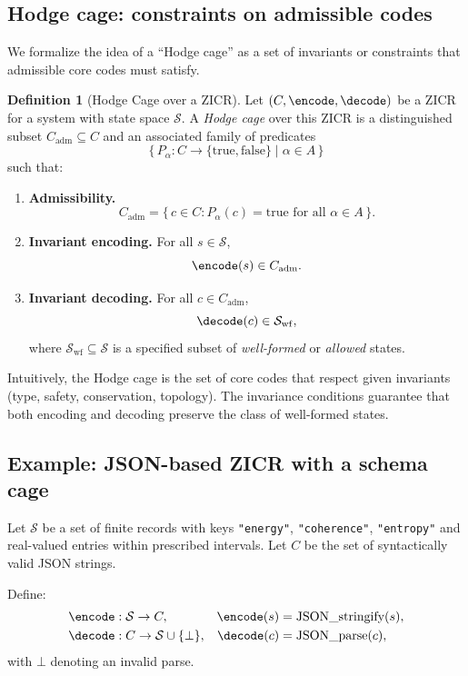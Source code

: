 \documentclass[11pt]{article}
\theoremstyle{definition}
\newtheorem{definition}{Definition}[section]
\begin{document}
\subsection{Hodge cage: constraints on admissible codes}

We formalize the idea of a ``Hodge cage'' as a set of invariants or constraints that admissible core codes must satisfy.

\begin{definition}[Hodge Cage over a ZICR]\label{def:hodge-cage}
Let $(C,\encode,\decode)$ be a ZICR for a system with state space $\mathcal{S}$.
A \emph{Hodge cage} over this ZICR is a distinguished subset $C_{\mathrm{adm}} \subseteq C$ and an associated family of predicates
\[
\{\, P_\alpha : C \to \{\mathrm{true},\mathrm{false}\} \mid \alpha \in A \,\}
\]
such that:
\begin{enumerate}
    \item \textbf{Admissibility.}
    \[
        C_{\mathrm{adm}} = \{\, c \in C : P_\alpha(c) = \mathrm{true} \text{ for all } \alpha \in A \,\}.
    \]
    \item \textbf{Invariant encoding.}
    For all $s \in \mathcal{S}$,
    \[
        \encode(s) \in C_{\mathrm{adm}}.
    \]
    \item \textbf{Invariant decoding.}
    For all $c \in C_{\mathrm{adm}}$,
    \[
        \decode(c) \in \mathcal{S}_{\mathrm{wf}},
    \]
    where $\mathcal{S}_{\mathrm{wf}} \subseteq \mathcal{S}$ is a specified subset of \emph{well-formed} or \emph{allowed} states.
\end{enumerate}
\end{definition}

Intuitively, the Hodge cage is the set of core codes that respect given invariants (type, safety, conservation, topology).
The invariance conditions guarantee that both encoding and decoding preserve the class of well-formed states.

\subsection{Example: JSON-based ZICR with a schema cage}

Let $\mathcal{S}$ be a set of finite records with keys \texttt{"energy"}, \texttt{"coherence"}, \texttt{"entropy"} and real-valued entries within prescribed intervals.
Let $C$ be the set of syntactically valid JSON strings.

Define:
\begin{align*}
\encode &: \mathcal{S} \to C, & \encode(s) &= \text{JSON\_stringify}(s), \\
\decode &: C \to \mathcal{S} \cup \{\bot\}, & \decode(c) &= \text{JSON\_parse}(c),
\end{align*}
with $\bot$ denoting an invalid parse.
\end{document}
